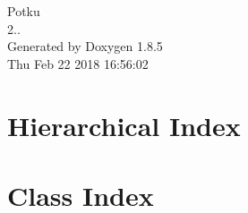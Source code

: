 \documentclass[twoside]{book}
\newcommand{\clearemptydoublepage}{%
  \newpage{\pagestyle{empty}\cleardoublepage}%
}
\begin{document}
\hypersetup{pageanchor=false}
\begin{titlepage}
\vspace*{7cm}
\begin{center}%
{\Large Potku \\[1ex]\large 2.. }\\
\vspace*{1cm}
{\large Generated by Doxygen 1.8.5}\\
\vspace*{0.5cm}
{\small Thu Feb 22 2018 16:56:02}\\
\end{center}
\end{titlepage}
\clearemptydoublepage
\tableofcontents
\clearemptydoublepage
{}
\hypersetup{pageanchor=true}

\chapter{Hierarchical Index}

\chapter{Class Index}

\end{document}
